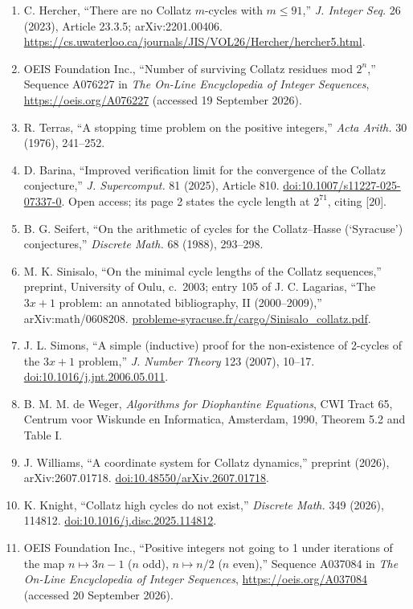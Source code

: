 \documentclass[12pt]{article}
\begin{document}
\begin{enumerate}
  146--154; with S. Puchert, ``Anmerkung zum Artikel `\"{U}ber die
  L\"{a}nge nicht-trivialer Collatz-Zyklen','' \emph{Die Wurzel} 11
  (2018), 243--250.
\item
  C. Hercher, ``There are no Collatz \(m\)-cycles with \(m\le 91\),''
  \emph{J. Integer Seq.} 26 (2023), Article 23.3.5; arXiv:2201.00406.
  \url{https://cs.uwaterloo.ca/journals/JIS/VOL26/Hercher/hercher5.html}.
\item
  OEIS Foundation Inc., ``Number of surviving Collatz residues mod
  \(2^n\),'' Sequence A076227 in \emph{The On-Line Encyclopedia of
  Integer Sequences}, \url{https://oeis.org/A076227} (accessed 19
  September 2026).
\item
  R. Terras, ``A stopping time problem on the positive integers,''
  \emph{Acta Arith.} 30 (1976), 241--252.
\item
  D. Barina, ``Improved verification limit for the convergence of the
  Collatz conjecture,'' \emph{J. Supercomput.} 81 (2025), Article 810.
  \href{https://doi.org/10.1007/s11227-025-07337-0}{doi:10.1007/s11227-025-07337-0}.
  Open access; its page 2 states the cycle length at \(2^{71}\), citing
  {[}20{]}.
\item
  B. G. Seifert, ``On the arithmetic of cycles for the Collatz--Hasse
  (`Syracuse') conjectures,'' \emph{Discrete Math.} 68 (1988), 293--298.
\item
  M. K. Sinisalo, ``On the minimal cycle lengths of the Collatz
  sequences,'' preprint, University of Oulu, c.~2003; entry 105 of J. C.
  Lagarias, ``The \(3x+1\) problem: an annotated bibliography, II
  (2000--2009),'' arXiv:math/0608208.
  \href{https://www.probleme-syracuse.fr/cargo/Sinisalo_collatz.pdf}{probleme-syracuse.fr/cargo/Sinisalo\_collatz.pdf}.
\item
  J. L. Simons, ``A simple (inductive) proof for the non-existence of
  2-cycles of the \(3x+1\) problem,'' \emph{J. Number Theory} 123
  (2007), 10--17.
  \href{https://doi.org/10.1016/j.jnt.2006.05.011}{doi:10.1016/j.jnt.2006.05.011}.
\item
  B. M. M. de Weger, \emph{Algorithms for Diophantine Equations}, CWI
  Tract 65, Centrum voor Wiskunde en Informatica, Amsterdam, 1990,
  Theorem 5.2 and Table I.
\item
  J. Williams, ``A coordinate system for Collatz dynamics,'' preprint
  (2026), arXiv:2607.01718.
  \href{https://doi.org/10.48550/arXiv.2607.01718}{doi:10.48550/arXiv.2607.01718}.
\item
  K. Knight, ``Collatz high cycles do not exist,'' \emph{Discrete Math.}
  349 (2026), 114812.
  \href{https://doi.org/10.1016/j.disc.2025.114812}{doi:10.1016/j.disc.2025.114812}.
\item
  OEIS Foundation Inc., ``Positive integers not going to 1 under
  iterations of the map \(n\mapsto 3n-1\) (\(n\) odd), \(n\mapsto n/2\)
  (\(n\) even),'' Sequence A037084 in \emph{The On-Line Encyclopedia of
  Integer Sequences}, \url{https://oeis.org/A037084} (accessed 20
  September 2026).
\end{enumerate}

\endgroup
\end{document}
